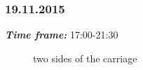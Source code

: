 \subsubsection{19.11.2015}
\textit{\textbf{Time frame:}} 17:00-21:30 \newline


\begin{figure}[H]
	\begin{minipage}[h]{1\linewidth}
		\caption{two sides of the carriage}
	\end{minipage}
\end{figure}

